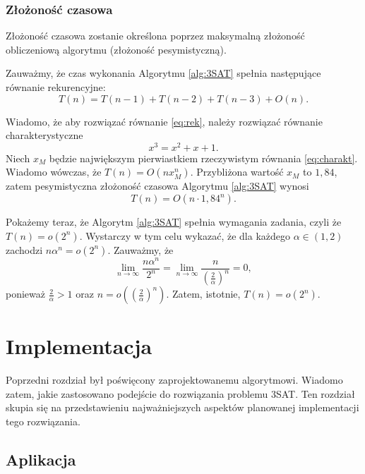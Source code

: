 \documentclass[a4paper,10pt,twoside]{report}
\theoremstyle{definition}
\begin{document}
\subsection{Złożoność czasowa}
Złożoność czasowa zostanie określona poprzez maksymalną złożoność obliczeniową algorytmu (złożoność pesymistyczną).

Zauważmy, że czas wykonania Algorytmu \ref{alg:3SAT} spełnia następujące równanie rekurencyjne:
\begin{equation}
\label{eq:rek}
    T(n) = T(n-1)+T(n-2)+T(n-3)+O(n).
\end{equation}

Wiadomo, że aby rozwiązać równanie \eqref{eq:rek}, należy rozwiązać równanie charakterystyczne
\begin{equation}
\label{eq:charakt}
    x^3=x^2+x+1.
\end{equation}
Niech $x_M$ będzie największym pierwiastkiem rzeczywistym równania \eqref{eq:charakt}. Wiadomo wówczas, że $T(n)=O(nx_M^n)$. Przybliżona wartość $x_M$ to $1,84$, zatem pesymistyczna złożoność czasowa Algorytmu \ref{alg:3SAT} wynosi
\begin{equation}
\label{eq:zlozonosc}
T(n)=O(n\cdot 1,84^n).
\end{equation}

Pokażemy teraz, że Algorytm \ref{alg:3SAT} spełnia wymagania zadania, czyli że $T(n)=o(2^n)$. Wystarczy w tym celu wykazać, że dla każdego $\alpha\in(1,2)$ zachodzi $n\alpha^n=o(2^n)$.
Zauważmy, że 
\begin{equation*}
    \lim_{n\to\infty}\frac{n\alpha^n}{2^n} = \lim_{n\to\infty}\frac{n}{\left(\frac{2}{\alpha}\right)^n}=0,
\end{equation*}
ponieważ $\frac{2}{\alpha} > 1$ oraz $n=o\left(\left(\frac{2}{\alpha}\right)^n\right)$. Zatem, istotnie, $T(n)=o(2^n)$.

\chapter{Implementacja}

Poprzedni rozdział był poświęcony zaprojektowanemu algorytmowi. Wiadomo zatem, jakie zastosowano podejście do rozwiązania problemu 3SAT. Ten rozdział skupia się na przedstawieniu najważniejszych aspektów planowanej implementacji tego rozwiązania.

\section{Aplikacja}
\end{document}
